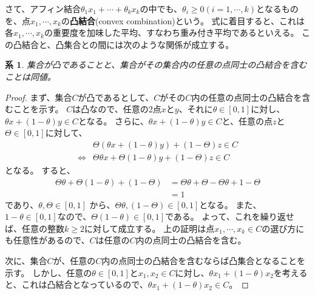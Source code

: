 \documentclass[pdflatex, ja=standard, a4paper]{bxjsarticle}
\newtheorem{corollary}{系}
\begin{document}
さて、アフィン結合$\theta_1 x_1 + \cdots + \theta_k x_k$の中でも、$\theta_i \geq 0 (i = 1, \cdots, k)$となるものを、点$x_1, \cdots, x_k$の\textbf{凸結合}(convex combination)という。
式に着目すると、これは各$x_1, \cdots, x_k$の重要度を加味した平均、すなわち重み付き平均であるといえる。
この凸結合と、凸集合との間には次のような関係が成立する。
\begin{corollary}
    集合が凸であることと、集合がその集合内の任意の点同士の凸結合を含むことは同値。
\end{corollary}
\begin{proof}
    まず、集合$C$が凸であるとして、$C$がその$C$内の任意の点同士の凸結合を含むことを示す。
    $C$は凸なので、任意の2点$x$と$y$、それに$\theta \in [0, 1]$に対し、$\theta x + (1 - \theta) y \in C$となる。
    さらに、$\theta x + (1 - \theta) y \in C$と、任意の点$z$と$\Theta \in [0, 1]$に対して、
    \begin{align*}
        &\Theta (\theta x + (1 - \theta) y) + (1 - \Theta) z \in C \\
            \iff& \Theta \theta x + \Theta (1 - \theta) y + (1 - \Theta) z \in C
    \end{align*}
    となる。
    すると、
    \begin{align*}
        \Theta \theta + \Theta (1 - \theta) + (1 - \Theta)
            &= \Theta \theta + \Theta - \Theta \theta + 1 - \Theta \\
            &= 1
    \end{align*}
    であり、$\theta, \Theta \in [0, 1]$ から、$\Theta \theta, (1 - \Theta) \in [0, 1]$となる。
    また、$1 - \theta \in [0, 1]$なので、$\Theta (1 - \theta) \in [0, 1]$である。
    よって、これを繰り返せば、任意の整数$k \geq 2$に対して成立する。
    上の証明は点$x_1, \cdots, x_k \in C$の選び方にも任意性があるので、$C$は任意の$C$内の点同士の凸結合を含む。

    次に、集合$C$が、任意の$C$内の点同士の凸結合を含むならば凸集合となることを示す。
    しかし、任意の$\theta \in [0, 1]$と$x_1, x_2 \in C$に対し、$\theta x_1 + (1 - \theta) x_2$を考えると、これは凸結合となっているので、$\theta x_1 + (1 - \theta) x_2 \in C$。
\end{proof}
\end{document}
